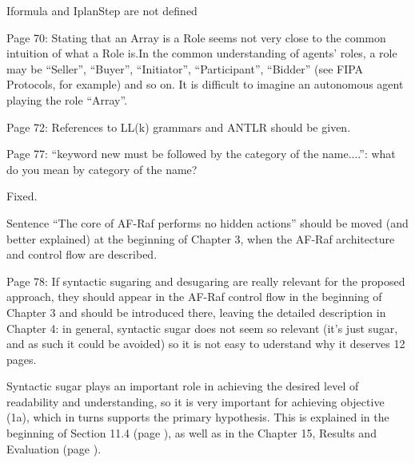 \documentclass{article}
\newcommand{\todo}[1]{[\textcolor{red}{TODO}: #1]}
\newenvironment{them}{\noindent\begingroup\color{blue}}{\endgroup\par}
\begin{document}
\begin{them}

Iformula and IplanStep are not defined
\end{them}
\todo{}

\begin{them}

Page 70:
Stating that an Array is a Role seems not very close to the common intuition of
what a Role is.In the common understanding of agents' roles, a role may be
“Seller”, “Buyer”, “Initiator”, “Participant”, “Bidder” (see FIPA Protocols,
for example) and so on. It is difficult to imagine an autonomous agent playing
the role “Array”.

\end{them}
\todo{}

\begin{them}

Page 72:
References to LL(k) grammars and ANTLR should be given.
\end{them}
\todo{}

\begin{them}

Page 77:
“keyword new must be followed by the category of the name....”: what do you
mean by category of the name?

\end{them}
Fixed.

\begin{them}

Sentence “The core of AF-Raf performs no hidden actions” should be moved (and
better explained) at the beginning of Chapter 3, when the AF-Raf architecture
and control flow are described.

\end{them}
\todo{}

\begin{them}

Page 78:
If syntactic sugaring and desugaring are really relevant for the proposed
approach, they should appear in the AF-Raf control flow in the beginning of
Chapter 3 and should be introduced there, leaving the detailed description in
Chapter 4: in general, syntactic sugar does not seem so relevant (it's just
sugar, and as such it could be avoided) so it is not easy to uderstand why it
deserves 12 pages.

\end{them}

Syntactic sugar plays an important role in achieving the desired level of
readability and understanding, so it is very important for achieving objective
(1a), which in turns supports the primary hypothesis. This is explained in the
beginning of Section 11.4 (page ), as well as in the Chapter 15, Results and
Evaluation (page ).
\end{document}
